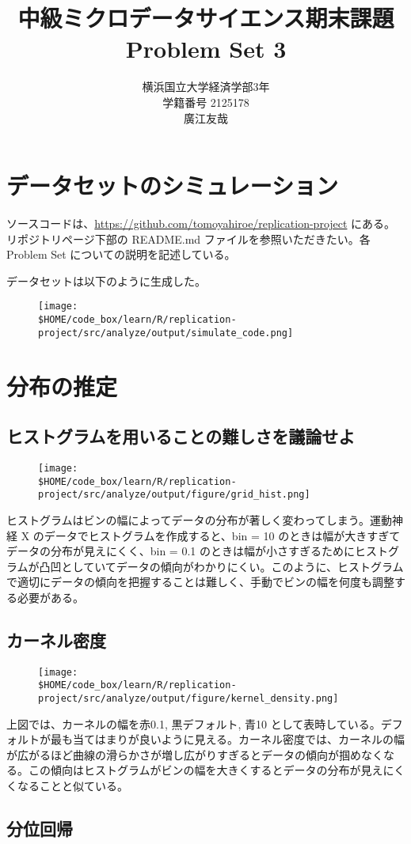 \documentclass[a4paper]{jsarticle}
\title{中級ミクロデータサイエンス期末課題\\Problem Set 3}
\author{横浜国立大学経済学部3年\\学籍番号 2125178\\廣江友哉}
\begin{document}
\maketitle

\section{データセットのシミュレーション}

ソースコードは、\url{https://github.com/tomoyahiroe/replication-project} にある。リポジトリページ下部の README.md ファイルを参照いただきたい。各Problem Set についての説明を記述している。

データセットは以下のように生成した。

\begin{figure}[H]
  \centering
  \texttt{[image: \\\$HOME/code\_box/learn/R/replication-project/src/analyze/output/simulate\_code.png]}

\end{figure}


\section{分布の推定}

\subsection{ヒストグラムを用いることの難しさを議論せよ}
\begin{figure}[H]
  \centering
  \texttt{[image: \\\$HOME/code\_box/learn/R/replication-project/src/analyze/output/figure/grid\_hist.png]}

\end{figure}

ヒストグラムはビンの幅によってデータの分布が著しく変わってしまう。運動神経 X のデータでヒストグラムを作成すると、bin = 10 のときは幅が大きすぎてデータの分布が見えにくく、bin = 0.1 のときは幅が小さすぎるためにヒストグラムが凸凹としていてデータの傾向がわかりにくい。このように、ヒストグラムで適切にデータの傾向を把握することは難しく、手動でビンの幅を何度も調整する必要がある。

\subsection {カーネル密度}
\begin{figure}[H]
  \centering
  \texttt{[image: \\\$HOME/code\_box/learn/R/replication-project/src/analyze/output/figure/kernel\_density.png]}

\end{figure}

上図では、カーネルの幅を赤0.1, 黒デフォルト, 青10 として表時している。デフォルトが最も当てはまりが良いように見える。カーネル密度では、カーネルの幅が広がるほど曲線の滑らかさが増し広がりすぎるとデータの傾向が掴めなくなる。この傾向はヒストグラムがビンの幅を大きくするとデータの分布が見えにくくなることと似ている。

\subsection{分位回帰}
\end{document}
